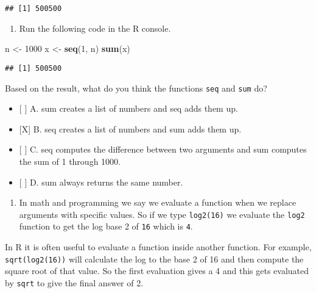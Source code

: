 \documentclass[]{article}
\newenvironment{Shaded}{\begin{snugshade}}{\end{snugshade}}
\newcommand{\DecValTok}[1]{\textcolor[rgb]{0.00,0.00,0.81}{#1}}
\newcommand{\KeywordTok}[1]{\textcolor[rgb]{0.13,0.29,0.53}{\textbf{#1}}}
\newcommand{\NormalTok}[1]{#1}
\newcommand{\StringTok}[1]{\textcolor[rgb]{0.31,0.60,0.02}{#1}}
\providecommand{\tightlist}{%
  \setlength{\itemsep}{0pt}\setlength{\parskip}{0pt}}
\begin{document}
\begin{verbatim}
## [1] 500500
\end{verbatim}

\begin{enumerate}
\def\labelenumi{\arabic{enumi}.}
\setcounter{enumi}{2}
\tightlist
\item
  Run the following code in the R console.
\end{enumerate}

\begin{Shaded}
\begin{Highlighting}[]
\NormalTok{n <-}\StringTok{ }\DecValTok{1000}
\NormalTok{x <-}\StringTok{ }\KeywordTok{seq}\NormalTok{(}\DecValTok{1}\NormalTok{, n)}
\KeywordTok{sum}\NormalTok{(x)}
\end{Highlighting}
\end{Shaded}

\begin{verbatim}
## [1] 500500
\end{verbatim}

Based on the result, what do you think the functions \texttt{seq} and
\texttt{sum} do?

\begin{itemize}
\tightlist
\item
  {[} {]} A. sum creates a list of numbers and seq adds them up.
\item
  {[}X{]} B. seq creates a list of numbers and sum adds them up.
\item
  {[} {]} C. seq computes the difference between two arguments and sum
  computes the sum of 1 through 1000.
\item
  {[} {]} D. sum always returns the same number.
\end{itemize}

\begin{enumerate}
\def\labelenumi{\arabic{enumi}.}
\setcounter{enumi}{3}
\tightlist
\item
  In math and programming we say we evaluate a function when we replace
  arguments with specific values. So if we type \texttt{log2(16)} we
  evaluate the \texttt{log2} function to get the log base 2 of
  \texttt{16} which is \texttt{4}.
\end{enumerate}

In R it is often useful to evaluate a function inside another function.
For example, \texttt{sqrt(log2(16))} will calculate the log to the base
2 of 16 and then compute the square root of that value. So the first
evaluation gives a 4 and this gets evaluated by \texttt{sqrt} to give
the final answer of 2.
\end{document}
